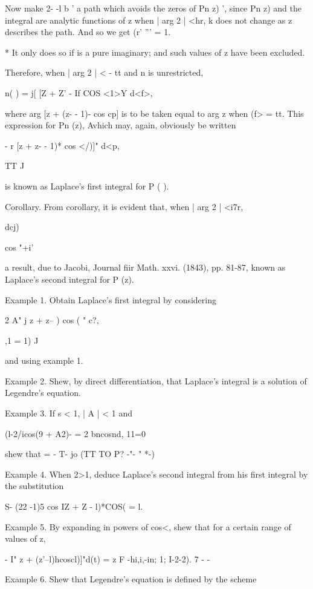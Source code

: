 {{Now make 2- -l b ' a path which avoids the zeros of Pn z) ', since Pn
z) and the integral are analytic functions of z when | arg 2 | <hr, k
does not change as z describes the path. And so we get (r' ''' = 1.

* It only does so if is a pure imaginary; and such values of z have
been excluded.

%
%

Therefore, when | arg 2 | < - tt and n is unrestricted,

 n( ) = j[ [Z + Z' - If COS <1>Y d<f>,

where arg [z + (z- - 1)- cos cp] is to be taken equal to arg z when
(f> = tt. This expression for Pn (z), Avhich may, again, obviously be
written

- r [z + z- - 1)* cos </)]" d<p,

TT J

is known as Laplace's first integral for P ( ).

Corollary. From corollary, it is evident that, when | arg 2 |
<i7r,

dcj)

 cos "+i'

a result, due to Jacobi, Journal fiir Math. xxvi. (1843), pp. 81-87,
known as Laplace's second integral for P (z).

Example 1. Obtain Laplace's first integral by considering

2 A" j z + z-- ) cos ( " c?,

,1 = 1) J

and using example 1.

Example 2. Shew, by direct differentiation, that Laplace's integral is
a solution of Legendre's equation.

Example 3. If s < 1, | A | < 1 and

(l-2/icos(9 + A2)- = 2 bncosnd, 11=0

shew that = - T- jo (TT TO P? -"- " *-)

Example 4. When 2>1, deduce Laplace's second integral from his first
integral by the substitution

 S- (22 -1)5 cos IZ + Z - l)*COS( = l.

Example 5. By expanding in powers of cos<, shew that for a certain
range of values of z,

- I" z + (z'--l)hcoscl)]"d(t) = z F -hi,i,-in; 1; I-2-2). 7  - -

Example 6. Shew that Legendre's equation is defined by the scheme

}}
